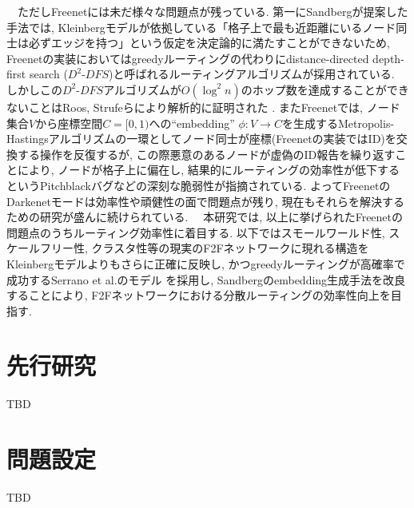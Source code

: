 \documentclass[dvipdfmx]{ampbt}
\begin{document}
\ \ ただしFreenetには未だ様々な問題点が残っている. 第一にSandbergが提案した手法では, Kleinbergモデルが依拠している「格子上で最も近距離にいるノード同士は必ずエッジを持つ」という仮定を決定論的に満たすことができないため, Freenetの実装においてはgreedyルーティングの代わりにdistance-directed depth-first search ($D^2$-$DFS$)と呼ばれるルーティングアルゴリズムが採用されている. しかしこの$D^2$-$DFS$アルゴリズムが$O(\log^2 n)$のホップ数を達成することができないことはRoos, Strufeらにより解析的に証明された\cite{roos2012provable} \cite{roos2016dealing}. またFreenetでは, ノード集合$V$から座標空間$C= [0,1)$への``embedding'' $\phi: V \to C$を生成するMetropolis-Hastingsアルゴリズムの一環としてノード同士が座標(Freenetの実装ではID)を交換する操作を反復するが, この際悪意のあるノードが虚偽のID報告を繰り返すことにより, ノードが格子上に偏在し, 結果的にルーティングの効率性が低下するというPitchblackバグ\cite{evans2007routing}などの深刻な脆弱性が指摘されている. よってFreenetのDarkenetモードは効率性や頑健性の面で問題点が残り, 現在もそれらを解決するための研究が盛んに続けられている. \newline
\ \ 本研究では, 以上に挙げられたFreenetの問題点のうちルーティング効率性に着目する. 以下ではスモールワールド性, スケールフリー性, クラスタ性等の現実のF2Fネットワークに現れる構造をKleinbergモデルよりもさらに正確に反映し, かつgreedyルーティングが高確率で成功するSerrano et al.のモデル\cite{serrano2008self} \cite{boguna2009navigability}を採用し, Sandbergのembedding生成手法を改良することにより, F2Fネットワークにおける分散ルーティングの効率性向上を目指す. 


\section{先行研究}
TBD
\cite{clarke2001freenet}
\cite{sandberg2006distributed}
\cite{sandberg2006evolution}
\cite{sandberg2008neighbor}
\cite{mogren2008adaptive}
\cite{evans2007routing}
\cite{clarke2010private}
\cite{schiller2011attack}
\cite{roos2012provable}
\cite{roos2013contribution}
\cite{roos2016dealing}
\cite{hofer2013greedy}
\cite{roos2016anonymous}
\cite{roos2016analyzing}
\cite{kleinberg2000small}
\cite{csimcsek2008navigating}
\cite{serrano2008self}
\cite{boguna2009navigating}
\cite{boguna2009navigability}
\cite{kleinberg2007geographic}
\cite{cvetkovski2009hyperbolic}
\cite{krioukov2010hyperbolic}
\cite{boguna2010sustaining}
\cite{papadopoulos2015network}
\cite{blasius2016efficient}
\cite{kleinberg2006complex}
\cite{huang2014navigation}
\cite{van2010graph}
\fi
\section{問題設定}
TBD
\end{document}
